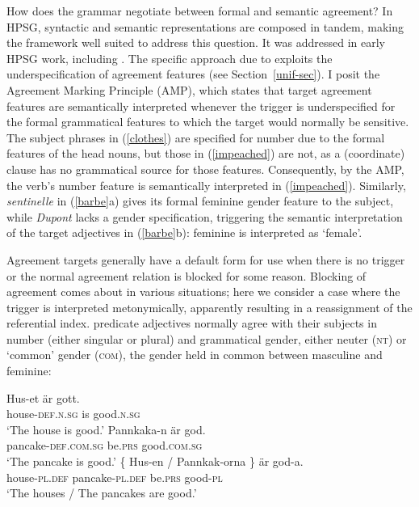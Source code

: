 \documentclass[output=paper
 	        ,biblatex
                ,babelshorthands
                ,newtxmath
                ,draftmode
                ,colorlinks, citecolor=brown
]{langscibook}
\begin{document}
How does the grammar negotiate between formal and semantic agreement?  In HPSG, syntactic and semantic representations are composed in tandem, making the framework well suited to address this question.   It was addressed in early HPSG work, including \cite[Chapter~1]{Pollard+Sag:1994}.   The specific approach due to \cite{Wechsler:2011} exploits the underspecification of agreement features (see Section~\ref{unif-sec}).  I posit the Agreement Marking Principle (AMP), which states that target agreement features are semantically interpreted whenever the trigger is underspecified for the formal grammatical features to which the target would normally be sensitive.   The subject phrases in (\ref{clothes}) are specified for number due to the formal features of the head nouns, but those in (\ref{impeached}) are not, as a (coordinate) clause has no grammatical source for those features.  Consequently, by the AMP, the verb's number feature is semantically interpreted in (\ref{impeached}).  Similarly, \textit{sentinelle} in (\ref{barbe}a) gives its formal feminine gender feature to the subject, while \textit{Dupont} lacks a gender specification, triggering the semantic interpretation of the target adjectives in (\ref{barbe}b): feminine is interpreted as `female'.    

Agreement targets generally have a default form for use when there is no trigger or the normal agreement relation is blocked for some reason.   
Blocking of agreement comes about in various situations; here we  consider a case where the trigger is interpreted metonymically,  apparently resulting in a reassignment of the referential index.   predicate adjectives normally agree with their subjects in number (either singular or plural) and grammatical gender, either neuter (\textsc{nt}) or `common' gender (\textsc{com}), the gender held in common between masculine and feminine: 

\begin{exe} 
\ex \label{huset}
 \begin{xlist}
\ex 
\gll 	Hus-et 	är	gott. \\
		house-\textsc{def.n.sg}	is	good.\textsc{n.sg} \\
\glt	`The house is good.’
\ex   
\gll  Pannkaka-n 	är	god. \\
	pancake-\textsc{def.com.sg} 	be.\textsc{prs} 	good.\textsc{com.sg} \\
\glt	`The pancake is good.’
\ex   
\gll   \{   Hus-en / Pannkak-orna 	\}	är	god-a. \\
	   {}   house-\textsc{pl.def} {} pancake-\textsc{pl.def} {} be.\textsc{prs} good-\textsc{pl}  \\
\glt	`The houses / The pancakes are good.’
\end{xlist}
\end{exe}
\end{document}

